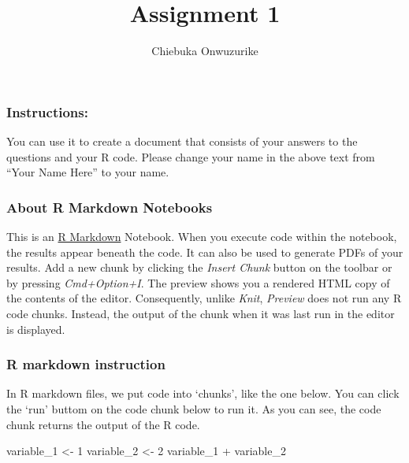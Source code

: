\documentclass[
]{article}
\title{Assignment 1}
\author{Chiebuka Onwuzurike}
\date{}
\newenvironment{Shaded}{\begin{snugshade}}{\end{snugshade}}
\newcommand{\DecValTok}[1]{\textcolor[rgb]{0.00,0.00,0.81}{#1}}
\newcommand{\NormalTok}[1]{#1}
\newcommand{\OtherTok}[1]{\textcolor[rgb]{0.56,0.35,0.01}{#1}}
\newcommand{\SpecialCharTok}[1]{\textcolor[rgb]{0.00,0.00,0.00}{#1}}
\begin{document}
\maketitle

\hypertarget{instructions}{%
\subsubsection{Instructions:}\label{instructions}}

You can use it to create a document that consists of your answers to the
questions and your R code. Please change your name in the above text
from ``Your Name Here'' to your name.

\hypertarget{about-r-markdown-notebooks}{%
\subsubsection{About R Markdown
Notebooks}\label{about-r-markdown-notebooks}}

This is an \href{http://rmarkdown.rstudio.com}{R Markdown} Notebook.
When you execute code within the notebook, the results appear beneath
the code. It can also be used to generate PDFs of your results. Add a
new chunk by clicking the \emph{Insert Chunk} button on the toolbar or
by pressing \emph{Cmd+Option+I}. The preview shows you a rendered HTML
copy of the contents of the editor. Consequently, unlike \emph{Knit},
\emph{Preview} does not run any R code chunks. Instead, the output of
the chunk when it was last run in the editor is displayed.

\hypertarget{r-markdown-instruction}{%
\subsubsection{R markdown instruction}\label{r-markdown-instruction}}

In R markdown files, we put code into `chunks', like the one below. You
can click the `run' buttom on the code chunk below to run it. As you can
see, the code chunk returns the output of the R code.

\begin{Shaded}
\begin{Highlighting}[]
\NormalTok{variable\_1 }\OtherTok{\textless{}{-}} \DecValTok{1}
\NormalTok{variable\_2 }\OtherTok{\textless{}{-}} \DecValTok{2}
\NormalTok{variable\_1 }\SpecialCharTok{+}\NormalTok{ variable\_2}
\end{Highlighting}
\end{Shaded}
\end{document}
